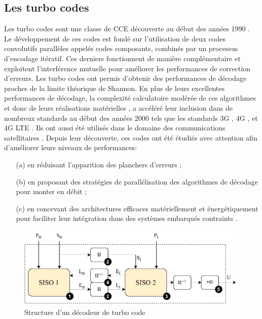 \documentclass[../main.tex]{subfiles}
\begin{document}
\subsection{Les turbo codes}
%
%
%
%
Les turbo codes sont une classe de CCE découverte au début des années 1990  \cite{NearShanon, BookCodes}. Le développement de ces codes est fondé sur l'utilisation de deux codes convolutifs parallèles appelés codes composants, combinés par un processus d'encodage itératif. Ces derniers fonctionnent de manière complémentaire et exploitent l'interférence mutuelle pour améliorer les performances de correction d'erreurs. 
Les turbo codes ont permis d’obtenir des performances de décodage proches de la limite théorique de Shannon. 
En plus de leurs excellentes performances de décodage, la complexité calculatoire modérée de ces algorithmes et donc de leurs réalisations matérielles \cite{TURBO:TEN}, a accéléré leur inclusion dans de nombreux standards au début des années 2000 tels que les standards 3G \cite{3G}, 4G \cite{4G}, et 4G LTE \cite{Ref_4G}. Ils ont aussi été utilisés dans le domaine des communications satellitaires  \cite{CCSDS:TURBO,DVB:RCS}.
Depuis leur découverte, ces codes ont été étudiés avec attention  \cite{TURBO:SURVEY} afin d’améliorer leurs niveaux de performances: 
\begin{itemize}
    \item[(a)] en réduisant l’apparition des planchers d’erreurs  \cite{TURBO:NEW:INTERL} ;
    \item[(b)] en proposant des stratégies de parallélisation des algorithmes de décodage pour monter en débit  \cite{TURBO:ALGO1,TURBO:PIPE} ;
    \item[(c)] en concevant des architectures efficaces matériellement et énergétiquement pour faciliter leur intégration dans des systèmes embarqués contraints \cite{TURBO:HARD1,TURBO:HARD2,TURBO:HARD3}.
\end{itemize} 

\begin{figure}[b]
    \centering
    \includegraphics[scale=1]{chapter2/figs/siso_turbo.pdf}
    \caption{Structure d’un décodeur de turbo code }
    \label{TURBO1}
\end{figure}
\end{document}
